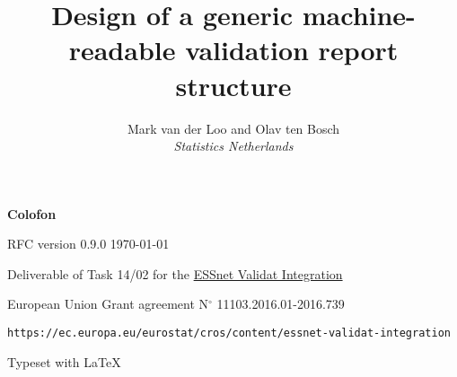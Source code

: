 \documentclass[a4paper, 11pt,titlepage]{article}
\title{Design of a generic machine-readable validation report structure}
\author{Mark van der Loo and Olav ten Bosch\\
\emph{Statistics Netherlands}
}
\date{\version{}\\
\begin{picture}(0,0)
\put(150,350){\texttt{[image: fig/logo\_validat\_integration.png]}}
\end{picture}
}
\newcommand{\version}{RFC version 0.9.0 \today}
\begin{document}
\maketitle{}

\thispagestyle{empty}
\null
\vfill{}
\begin{description}[noitemsep]
\item \textbf{Colofon}
\item \version{}
\item Deliverable of Task 14/02 for the \href{https://ec.europa.eu/eurostat/cros/content/essnet-validat-integration_en}{ESSnet Validat Integration}
\item European Union Grant agreement N$^\circ$ 11103.2016.01-2016.739
\item \texttt{https://ec.europa.eu/eurostat/cros/content/essnet-validat-integration}
\item Typeset with \LaTeX
\end{description}

\newpage

\tableofcontents{}

\newpage














\clearpage{}


%



\clearpage{}

\end{document}
